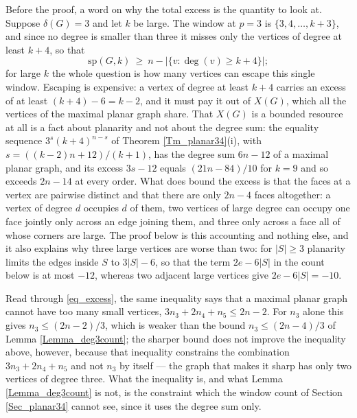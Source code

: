 \documentclass[10pt,a4paper]{article}
\begin{document}
Before the proof, a word on why the total excess is the quantity to look at. Suppose
$\delta (G)=3$ and let $k$ be large. The window at $p=3$ is $\{3,4,\ldots ,k+3\}$, and since no
degree is smaller than three it misses only the vertices of degree at least $k+4$, so that
\[
\mathrm{sp}(G,k)\ \geq \ n-\left\vert \{v:\deg (v)\geq k+4\}\right\vert ;
\]
for large $k$ the whole question is how many vertices can escape this single window. Escaping is
expensive: a vertex of degree at least $k+4$ carries an excess of at least $(k+4)-6=k-2$, and it
must pay it out of $X(G)$, which all the vertices of the maximal planar graph share. That $X(G)$ is a
bounded resource at all is a fact about planarity and not about the degree sum: the equality
sequence $3^{s}(k+4)^{n-s}$ of Theorem \ref{Tm_planar34}(i), with $s=((k-2)n+12)/(k+1)$, has the
degree sum $6n-12$ of a maximal planar graph, and its excess $3s-12$ equals $(21n-84)/10$ for $k=9$ and so
exceeds $2n-14$ at every order.
What does bound the excess is that the faces at a vertex are pairwise distinct and that there are
only $2n-4$ faces altogether: a vertex of degree $d$ occupies $d$ of them, two vertices of large
degree can occupy one face jointly only across an edge joining them, and three only across a face
all of whose corners are large. The proof below is this accounting and nothing else, and it also
explains why three large vertices are worse than two: for $|S|\geq 3$ planarity limits the edges
inside $S$ to $3|S|-6$, so that the term $2e-6|S|$ in the count below is at most $-12$, whereas
two adjacent large vertices give $2e-6|S|=-10$.

Read through \eqref{eq_excess}, the same inequality says that a maximal planar graph cannot have too many
small vertices, $3n_{3}+2n_{4}+n_{5}\leq 2n-2$. For $n_{3}$ alone this gives $n_{3}\leq (2n-2)/3$, which
is weaker than the bound $n_{3}\leq (2n-4)/3$ of Lemma \ref{Lemma_deg3count}; the sharper bound does not
improve the inequality above, however, because that inequality constrains the combination
$3n_{3}+2n_{4}+n_{5}$ and not $n_{3}$ by itself --- the graph that makes it sharp has only two vertices of
degree three. What the inequality is, and what Lemma \ref{Lemma_deg3count} is not, is the
constraint which the window count of Section \ref{Sec_planar34} cannot see, since it uses the degree
sum only.


\end{document}
